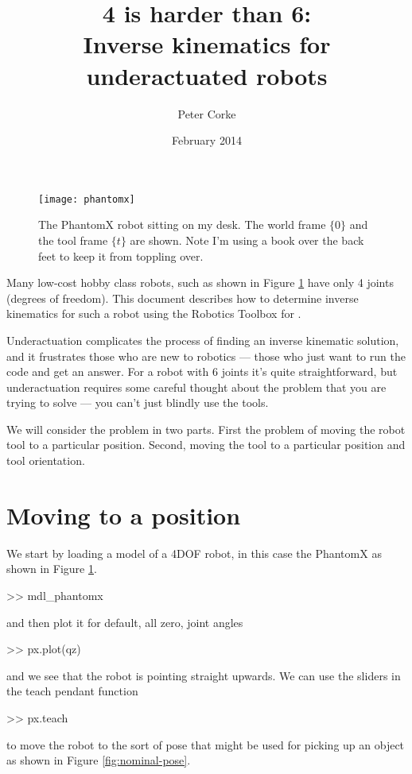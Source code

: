 \documentclass[11pt]{article}
\title{{\Huge 4 is harder than 6:}\\ Inverse kinematics for underactuated robots}
\author{Peter Corke}
\date{February 2014}                                           %
\begin{document}
\maketitle

	\begin{figure}[b!]
	\centering
	\texttt{[image: phantomx]}
	\caption{The PhantomX robot sitting on my desk.  The world frame $\{\!0\!\}$ and the tool frame $\{\!t\!\}$
	are shown.
	Note I'm using a book over the back feet to keep it from
	toppling over.}
	\label{fig:phantomx}
	\end{figure}
	
Many low-cost hobby class robots, such as shown in Figure \ref{fig:phantomx} have only 4 joints (degrees of freedom). 
This document describes how to determine inverse kinematics for such a robot using the Robotics
Toolbox\cite{Corke11a} for \Mlab.

Underactuation complicates the process of finding an inverse kinematic solution, and it frustrates those who are new to robotics ---
those who just want to run the code and get an answer.
For a robot with 6 joints it's quite straightforward, but underactuation 
requires some careful thought about the problem that you are trying to solve --- you can't just blindly use
the tools.






We will consider the problem in two parts.  First the problem of moving the robot tool to a particular position.  Second, moving the tool
to a particular position and tool orientation.

\section{Moving to a position}
We start by loading a model of a 4DOF robot, in this case the PhantomX as shown in Figure \ref{fig:phantomx}.
\begin{Code}
>> mdl_phantomx
\end{Code}
and then plot it for default, all zero, joint angles
\begin{Code}
>> px.plot(qz)
\end{Code}
and we see that the robot is pointing straight upwards.
We can use the sliders in the teach pendant function
\begin{Code}
>> px.teach
\end{Code}
to move the robot to the sort of pose that might be used for picking up an object as shown in Figure \ref{fig:nominal-pose}.
\end{document}
